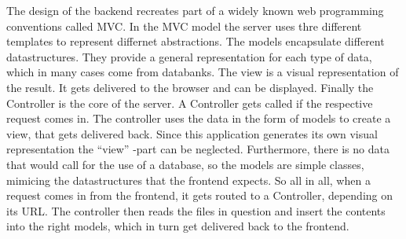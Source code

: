 The design of the backend recreates part of a widely known web programming conventions called MVC. In the MVC model the server uses thre different templates to represent differnet abstractions. The models encapsulate different datastructures. They provide a general representation for each type of data, which in many cases come from databanks. The view is a visual representation of the result. It gets delivered to the browser and can be displayed. Finally the Controller is the core of the server. A Controller gets called if the respective request comes in. The controller uses the data in the form of models to create a view, that gets delivered back. Since this application generates its own visual representation the ``view'' -part can be neglected. Furthermore, there is no data that would call for the use of a database, so the models are simple classes, mimicing the datastructures that the frontend expects. So all in all, when a request comes in from the frontend, it gets routed to a Controller, depending on its URL. The controller then reads the files in question and insert the contents into the right models, which in turn get delivered back to the frontend.

